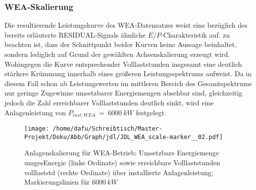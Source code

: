 \documentclass[onecolumn,10pt,titlepage]{article}
\begin{document}
\subsubsection{WEA-Skalierung}
Die resultierende Leistungskurve des WEA-Datensatzes weist eine bezüglich des bereits erläuterte RESIDUAL-Signals ähnliche $E/P$-Charakteristik auf.
zu beachten ist, dass der Schnittpunkt beider Kurven keine Aussage beinhaltet, sondern lediglich auf Grund der gewählten Achsenskalierung erzeugt wird.
 Wohingegen die Kurve entsprechender Volllaststunden insgesamt eine deutlich stärkere Krümmung innerhalb eines größeren Leistungsspektrums aufweist. Da in diesem Fall schon ab Leistungswerten im mittleren Bereich des Gesamtspektrums nur geringe Zugewinne umsetzbarer Energiemengen absehbar sind, gleichzeitig jedoch die Zahl erreichbarer Volllaststunden deutlich sinkt, wird eine Anlagenleistung von $P_{inst,WEA} ~=~6000~kW$ festgelegt.
\begin{figure}[H]

	\centering
	\texttt{[image: /home/dafu/Schreibtisch/Master-Projekt/Doku/Abb/Graph/jdl/JDL\_WEA\_scale-marker\_\_02.pdf]}

	\caption[Anlagenskalierung für WEA-Betrieb]{Anlagenskalierung für WEA-Betrieb; Umsetzbare Energiemenge \gls{umgesEnergie} (linke Ordinate) sowie erreichbare Volllaststunden \gls{volllaststd} (rechte Ordinate) über installierte Anlagenleistung; Markierungslinien für $6000~kW$}
	\label{fig:Skal_WEA}
\end{figure}
\end{document}
